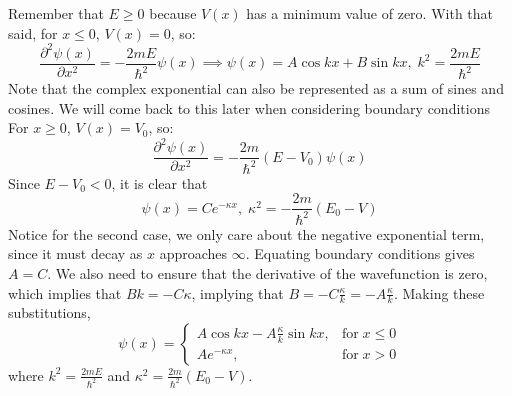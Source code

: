 \begin{sol}
Remember that $E \geq 0$ because $V(x)$ has a minimum value of zero. With that said, for $x\leq0$, $V(x) = 0$, so: $$\frac{\partial^2\psi(x)}{\partial x^2} = -\frac{2mE}{\hbar^2}\psi(x)\implies \psi(x) = A\cos{kx} + B\sin{kx},\;k^2 = \frac{2mE}{\hbar^2}$$Note that the complex exponential can also be represented as a sum of sines and cosines. We will come back to this later when considering boundary conditions \newline For $x \geq 0$, $V(x) = V_0$, so: $$\frac{\partial^2\psi(x)}{\partial x^2} = -\frac{2m}{\hbar^2}\left(E - V_0\right)\psi(x)$$
Since $E - V_0 < 0$, it is clear that $$\psi(x) = Ce^{-\kappa x},\;\kappa^2 = -\frac{2m}{\hbar^2}\left(E_0 - V\right)$$
Notice for the second case, we only care about the negative exponential term, since it must decay as $x$ approaches $\infty$.
Equating boundary conditions gives $A = C$. We also need to ensure that the derivative of the wavefunction is zero, which implies that $Bk = -C\kappa$, implying that $B = -C\frac{\kappa}{k} = -A\frac{\kappa}{k}$. Making these substitutions,
\[\psi(x) = \begin{cases} 
      A\cos{kx} - A\frac{\kappa}{k}\sin{kx}, & \mathrm{for}\;x\leq 0 \\
      Ae^{-\kappa x}, & \mathrm{for}\;x> 0
   \end{cases}
  \]where $k^2 = \frac{2mE}{\hbar^2}$ and $\kappa^2 = \frac{2m}{\hbar^2}\left(E_0 - V\right)$.
\end{sol}